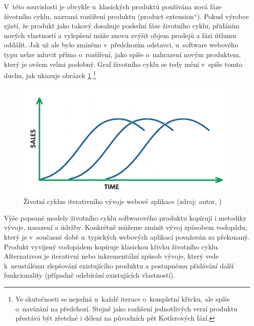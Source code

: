 \documentclass[12pt,oneside,openany]{fithesis}
\begin{document}
V~této souvislosti je obvykle u~klasických produktů používána nová fáze 
životního cyklu, nazvaná rozšíření produktu (\glqq product 
extension\textquotedblleft{}). Pokud výrobce zjistí, že produkt jako takový 
dosahuje poslední fáze životního cyklu, přidáním nových vlastností a 
vylepšení může znovu zvýšit objem prodejů a fázi útlumu oddálit. Jak 
už ale bylo zmíněno v~předchozím odstavci, u~software webového typu nelze 
mluvit přímo o~rozšíření, jako spíše o~nahrazení novým produktem, 
který je ovšem velmi podobný. Graf životního cyklu se tedy mění 
v~spíše tomto duchu, jak ukazuje obrázek 
\hyperlink{fig-product-lifecycle-sw}{{\ref{fig-product-lifecycle-sw}}}.\footnote{
    Ve skutečnosti se nejedná u~každé iterace o~kompletní křivku, ale 
spíše o~navázání na předchozí. Stejně jako rozlišení jednotlivých 
verzí produktu přestává být zřetelné i dělení na původních pět 
Kotlerových fází.}

\begin{figure}[hbt]
    \hypertarget{fig-product-lifecycle-sw}{}%
    \begin{center}

        
        \includegraphics[]{img/product-lifecycle-sw}
        
        \caption[{Životní cyklus iterativního vývoje webové aplikace}]{Životní cyklus iterativního vývoje webové aplikace (zdroj: autor, \cite{product-lifecycle-graph})}
        \label{fig-product-lifecycle-sw}
    \end{center}
\end{figure}

Výše popsané modely životního cyklu softwarového produktu kopírují i 
metodiky vývoje, nasazení a údržby. Konkrétně můžeme zmínit vývoj 
způsobem vodopádu, který je v~současné době u~typických webových 
aplikací považován za překonaný. \cite{waterfall}{} Produkt vyvíjený 
vodopádem kopíruje klasickou křivku životního cyklu. Alternativou je 
iterativní nebo inkrementální způsob vývoje, který vede k~neustálému 
zlepšování existujícího produktu a postupnému přidávání další 
funkcionality (případně odebírání existujících vlastností).
\end{document}
